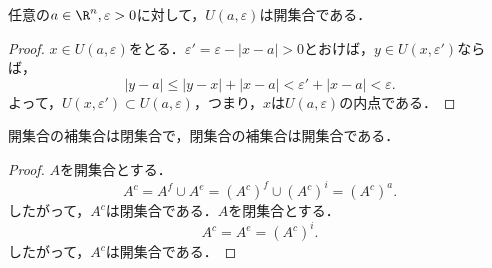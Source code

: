 \documentclass[a4paper,10pt]{ltjsarticle}
\begin{document}
\begin{MyProposition}
  任意の\(a \in \R^n, \varepsilon > 0\)に対して，\(U(a, \varepsilon)\)は開集合である．
\end{MyProposition}
\begin{proof}
  \(x \in U(a, \varepsilon)\)をとる．\(\varepsilon' = \varepsilon - |x - a| > 0\)とおけば，\(y \in U(x, \varepsilon')\)ならば，
  \[ |y - a| \le |y - x| + |x - a| < \varepsilon' + |x - a| < \varepsilon. \]
  よって，\(U(x, \varepsilon') \subset U(a, \varepsilon)\)，つまり，\(x\)は\(U(a, \varepsilon)\)の内点である．
\end{proof}

\begin{MyProposition}
  開集合の補集合は閉集合で，閉集合の補集合は開集合である．
\end{MyProposition}
\begin{proof}
  \(A\)を開集合とする．
  \[ A^c = A^f \cup A^e = (A^c)^f \cup (A^c)^i = (A^c)^a. \]
  したがって，\(A^c\)は閉集合である．\(A\)を閉集合とする．
  \[ A^c = A^e = (A^c)^i. \]
  したがって，\(A^c\)は開集合である．
\end{proof}
\end{document}
